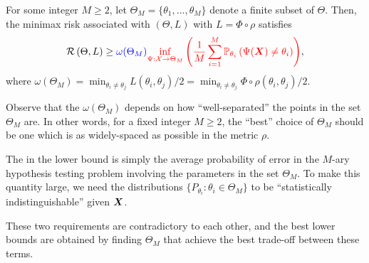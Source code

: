 \documentclass[12pt]{article}
\begin{document}
\begin{proposition}
\label{prop:reduction-to-testing} For some integer $M \geq 2$, let $\Theta_M = \{\theta_1, \ldots, \theta_M\}$ denote a finite subset of $\Theta$. Then, the minimax risk associated with $(\Theta, L)$ with $L = \Phi \circ \rho$ satisfies 
\begin{align}
{\cal R}\left( \Theta, L \right) \geq \textcolor{blue}{\omega(\Theta_M)} \textcolor{red}{\inf_{\Psi:{\cal X} \to \Theta_M} \left( \frac{1}{M} \sum_{i=1}^M \mathbb{P}_{\theta_i}\left( \Psi({\boldsymbol X}) \neq \theta_i \right) \right)}, 
\end{align}
where $\omega(\Theta_M) = \min_{\theta_i \neq \theta_j} L(\theta_i, \theta_j)/2 = \min_{\theta_i \neq \theta_j} \Phi \circ \rho(\theta_i, \theta_j)/2$. 
\end{proposition}
\begin{remark}
	\label{remark:reduction-to-testing} Observe that the  $\omega(\Theta_M)$ depends on how ``well-separated'' the points in the set $\Theta_M$ are. In other words, for a fixed integer $M \geq 2$, the ``best'' choice of $\Theta_M$ should be one which is as widely-spaced as possible in the metric $\rho$. 

	The  in the lower bound is simply the average probability of error in the $M$-ary hypothesis testing problem involving the parameters in the set $\Theta_M$. To make this quantity large,  we need the distributions $\{P_{\theta_i}: \theta_i \in \Theta_M\}$ to be ``statistically indistinguishable'' given  ${\boldsymbol X}$. 

	These two requirements are contradictory to each other, and the best lower bounds are obtained by finding $\Theta_M$ that achieve the best trade-off between these terms. 
\end{remark}
\end{document}
